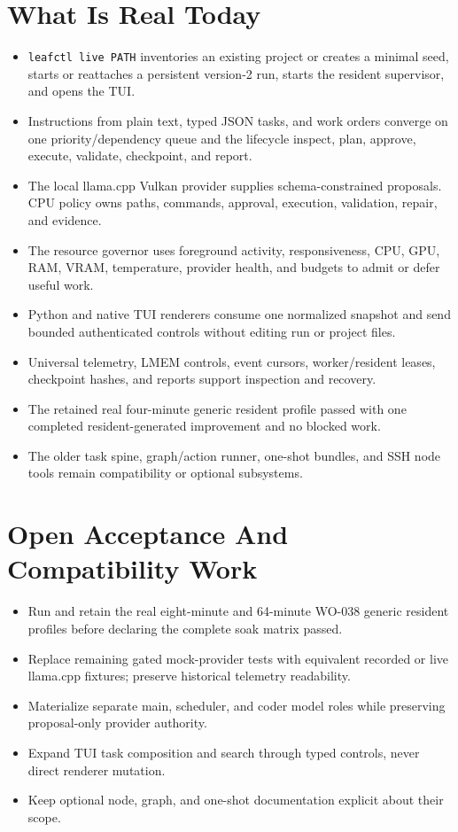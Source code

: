 \documentclass[11pt,a4paper]{article}
\begin{document}
\section*{What Is Real Today}

\begin{itemize}
  \item \texttt{leafctl live PATH} inventories an existing project or creates a minimal seed, starts or reattaches a persistent version-2 run, starts the resident supervisor, and opens the TUI.
  \item Instructions from plain text, typed JSON tasks, and work orders converge on one priority/dependency queue and the lifecycle inspect, plan, approve, execute, validate, checkpoint, and report.
  \item The local llama.cpp Vulkan provider supplies schema-constrained proposals. CPU policy owns paths, commands, approval, execution, validation, repair, and evidence.
  \item The resource governor uses foreground activity, responsiveness, CPU, GPU, RAM, VRAM, temperature, provider health, and budgets to admit or defer useful work.
  \item Python and native TUI renderers consume one normalized snapshot and send bounded authenticated controls without editing run or project files.
  \item Universal telemetry, LMEM controls, event cursors, worker/resident leases, checkpoint hashes, and reports support inspection and recovery.
  \item The retained real four-minute generic resident profile passed with one completed resident-generated improvement and no blocked work.
  \item The older task spine, graph/action runner, one-shot bundles, and SSH node tools remain compatibility or optional subsystems.
\end{itemize}

\section*{Open Acceptance And Compatibility Work}

\begin{itemize}
  \item Run and retain the real eight-minute and 64-minute WO-038 generic resident profiles before declaring the complete soak matrix passed.
  \item Replace remaining gated mock-provider tests with equivalent recorded or live llama.cpp fixtures; preserve historical telemetry readability.
  \item Materialize separate main, scheduler, and coder model roles while preserving proposal-only provider authority.
  \item Expand TUI task composition and search through typed controls, never direct renderer mutation.
  \item Keep optional node, graph, and one-shot documentation explicit about their scope.
\end{itemize}
\end{document}

